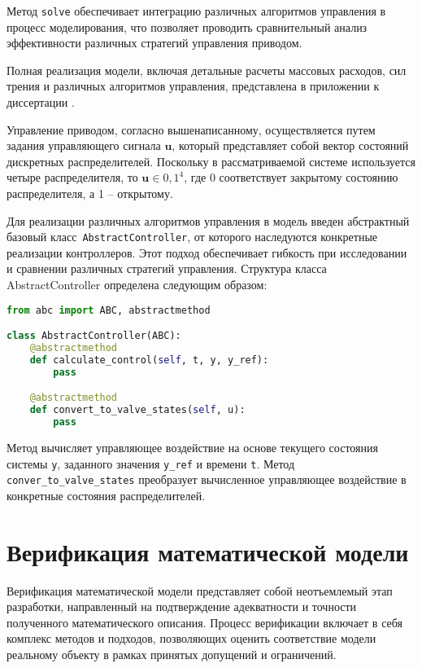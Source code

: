 Метод \texttt{solve} обеспечивает интеграцию различных алгоритмов управления в процесс моделирования,
что позволяет проводить сравнительный анализ эффективности различных стратегий управления приводом.

Полная реализация модели, включая детальные расчеты массовых расходов, сил трения и
различных алгоритмов управления, представлена в приложении к диссертации .

Управление приводом, согласно вышенаписанному, осуществляется путем задания управляющего сигнала $\mathbf{u}$,
который представляет собой вектор состояний дискретных распределителей. Поскольку в рассматриваемой системе используется четыре распределителя, то $\mathbf{u} \in {0,1}^4$, где 0 соответствует
закрытому состоянию распределителя, а 1 -- открытому.

Для реализации различных алгоритмов управления в модель введен абстрактный базовый класс~\texttt{AbstractController},
от которого наследуются конкретные реализации контроллеров. Этот подход обеспечивает гибкость при исследовании
и сравнении различных стратегий управления. Структура класса AbstractController определена следующим образом:

\begin{ListingEnv}[!h]%
    \captiondelim{ } %
    \caption{ \protect\python}\label{lst:AbstractControllerClass}
    \begin{lstlisting}[language={Python}]
from abc import ABC, abstractmethod

class AbstractController(ABC):
    @abstractmethod
    def calculate_control(self, t, y, y_ref):
        pass

    @abstractmethod
    def convert_to_valve_states(self, u):
        pass
    \end{lstlisting}
\end{ListingEnv}%

Метод  вычисляет управляющее воздействие на основе текущего состояния системы \texttt{y},
заданного значения \texttt{y\_ref} и времени \texttt{t}.
Метод \texttt{conver\_to\_valve\_states} преобразует вычисленное управляющее воздействие
в конкретные состояния распределителей.

\section{Верификация математической модели}\label{sec:ch2/sec7}
Верификация математической модели  представляет собой неотъемлемый этап разработки, направленный на подтверждение адекватности
и точности полученного математического описания. Процесс верификации включает в себя комплекс методов и подходов,
позволяющих оценить соответствие модели реальному объекту в рамках принятых допущений и ограничений.

